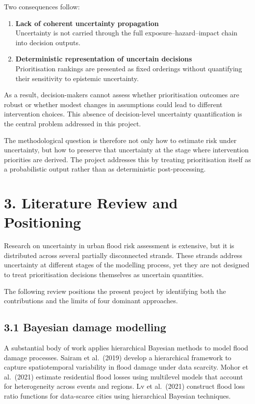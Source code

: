 \documentclass[
]{article}
\begin{document}
Two consequences follow:

\begin{enumerate}
\def\labelenumi{\arabic{enumi}.}
\item
  \textbf{Lack of coherent uncertainty propagation}\\
  Uncertainty is not carried through the full exposure--hazard--impact
  chain into decision outputs.
\item
  \textbf{Deterministic representation of uncertain decisions}\\
  Prioritisation rankings are presented as fixed orderings without
  quantifying their sensitivity to epistemic uncertainty.
\end{enumerate}

As a result, decision-makers cannot assess whether prioritisation
outcomes are robust or whether modest changes in assumptions could lead
to different intervention choices. This absence of decision-level
uncertainty quantification is the central problem addressed in this
project.

The methodological question is therefore not only how to estimate risk
under uncertainty, but how to preserve that uncertainty at the stage
where intervention priorities are derived. The project addresses this by
treating prioritisation itself as a probabilistic output rather than as
deterministic post-processing.

\section{3. Literature Review and
Positioning}\label{literature-review-and-positioning}

Research on uncertainty in urban flood risk assessment is extensive, but
it is distributed across several partially disconnected strands. These
strands address uncertainty at different stages of the modelling
process, yet they are not designed to treat prioritisation decisions
themselves as uncertain quantities.

The following review positions the present project by identifying both
the contributions and the limits of four dominant approaches.

\subsection{3.1 Bayesian damage
modelling}\label{bayesian-damage-modelling}

A substantial body of work applies hierarchical Bayesian methods to
model flood damage processes. Sairam et al.~(2019) develop a
hierarchical framework to capture spatiotemporal variability in flood
damage under data scarcity. Mohor et al.~(2021) estimate residential
flood losses using multilevel models that account for heterogeneity
across events and regions. Lv et al.~(2021) construct flood loss ratio
functions for data-scarce cities using hierarchical Bayesian techniques.
\end{document}
